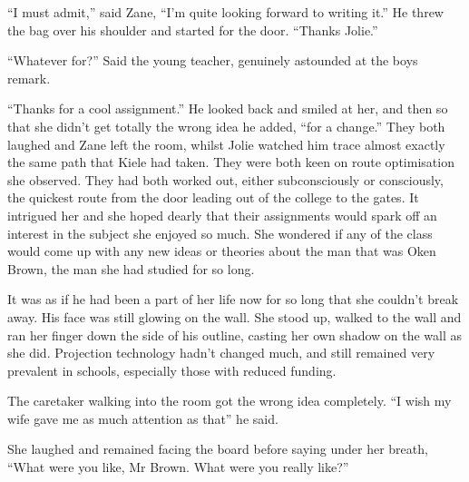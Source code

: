 ``I must admit,'' said Zane, ``I'm quite looking forward to writing it.''  He threw the bag over his shoulder and started for the door.  ``Thanks Jolie.''

``Whatever for?'' Said the young teacher, genuinely astounded at the boys remark.

``Thanks for a cool assignment.''  He looked back and smiled at her, and then so that she didn't get totally the wrong idea he added, ``for a change.''  They both laughed and Zane left the room, whilst Jolie watched him trace almost exactly the same path that Kiele had taken.  They were both keen on route optimisation she observed.  They had both worked out, either subconsciously or consciously, the quickest route from the door leading out of the college to the gates.  It intrigued her and she hoped dearly that their assignments would spark off an interest in the subject she enjoyed so much.  She wondered if any of the class would come up with any new ideas or theories about the man that was Oken Brown, the man she had studied for so long.

It was as if he had been a part of her life now for so long that she couldn't break away.  His face was still glowing on the wall.  She stood up, walked to the wall and ran her finger down the side of his outline, casting her own shadow on the wall as she did.  Projection technology hadn't changed much, and still remained very prevalent in schools, especially those with reduced funding.

The caretaker walking into the room got the wrong idea completely.  ``I wish my wife gave me as much attention as that'' he said.  

She laughed and remained facing the board before saying under her breath, ``What were you like, Mr Brown.  What were you really like?''





